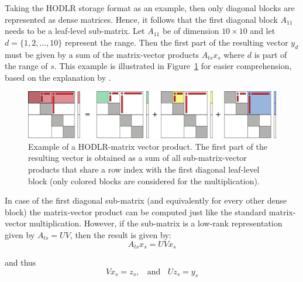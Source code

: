 \noindent Taking the HODLR storage format as an example, then only diagonal blocks are represented as dense matrices. Hence, it follows that the first diagonal block $A_{11}$ needs to be a leaf-level sub-matrix. Let $A_{11}$ be of dimension $10 \times 10$ and let $d = \{1,2,\dots, 10\}$ represent the range. Then the first part of the resulting vector $y_d$ must be given by a sum of the matrix-vector products $A_{ts}x_s$ where $d$ is part of the range of $s$. This example is illustrated in Figure~\hyperref[fig:matvec]{\ref{fig:matvec}} for easier comprehension, based on the explanation by \cite{ooi_effect_2020}.

\begin{figure}[h]
    \centering
    \includegraphics[width=\linewidth]{chapters/4_hierarchical_matrices/figures/matvec.pdf}
    \caption[Hierarchical Matrix-Vector Product]{Example of a HODLR-matrix vector product. The first part of the resulting vector is obtained as a sum of all sub-matrix-vector products that share a row index with the first diagonal leaf-level block (only colored blocks are considered for the multiplication).}
    \label{fig:matvec}
\end{figure}

In case of the first diagonal sub-matrix (and equivalently for every other dense block) the matrix-vector product can be computed just like the standard matrix-vector multiplication. However, if the sub-matrix is a low-rank representation given by $A_{ts} = UV$, then the result is given by:
\begin{equation}
    A_{ts}x_s = UVx_s
\end{equation}

\noindent and thus
\begin{equation}
        Vx_s = z_s, \;\; \text{ and }\;\; Uz_s = y_s 
\end{equation}

